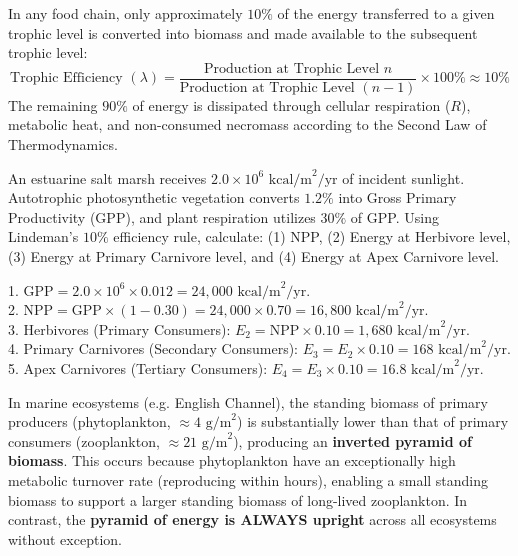 \begin{theorem}
In any food chain, only approximately $10\%$ of the energy transferred to a given trophic level is converted into biomass and made available to the subsequent trophic level:
\begin{equation}
\text{Trophic Efficiency } (\lambda) = \frac{\text{Production at Trophic Level } n}{\text{Production at Trophic Level } (n-1)} \times 100\% \approx 10\%
\end{equation}
The remaining $90\%$ of energy is dissipated through cellular respiration ($R$), metabolic heat, and non-consumed necromass according to the Second Law of Thermodynamics.
\end{theorem}

\begin{example}
An estuarine salt marsh receives $2.0 \times 10^6\text{ kcal/m}^2/\text{yr}$ of incident sunlight. Autotrophic photosynthetic vegetation converts $1.2\%$ into Gross Primary Productivity (GPP), and plant respiration utilizes $30\%$ of GPP. Using Lindeman's $10\%$ efficiency rule, calculate: (1) NPP, (2) Energy at Herbivore level, (3) Energy at Primary Carnivore level, and (4) Energy at Apex Carnivore level.
\end{example}

\begin{solutionbox}
1. $\text{GPP} = 2.0 \times 10^6 \times 0.012 = 24{,}000\text{ kcal/m}^2/\text{yr}$. \\
2. $\text{NPP} = \text{GPP} \times (1 - 0.30) = 24{,}000 \times 0.70 = 16{,}800\text{ kcal/m}^2/\text{yr}$. \\
3. Herbivores (Primary Consumers): $E_2 = \text{NPP} \times 0.10 = 1{,}680\text{ kcal/m}^2/\text{yr}$. \\
4. Primary Carnivores (Secondary Consumers): $E_3 = E_2 \times 0.10 = 168\text{ kcal/m}^2/\text{yr}$. \\
5. Apex Carnivores (Tertiary Consumers): $E_4 = E_3 \times 0.10 = 16.8\text{ kcal/m}^2/\text{yr}$.
\end{solutionbox}

\begin{casestudy}
In marine ecosystems (e.g. English Channel), the standing biomass of primary producers (phytoplankton, $\approx 4\text{ g/m}^2$) is substantially lower than that of primary consumers (zooplankton, $\approx 21\text{ g/m}^2$), producing an \textbf{inverted pyramid of biomass}. This occurs because phytoplankton have an exceptionally high metabolic turnover rate (reproducing within hours), enabling a small standing biomass to support a larger standing biomass of long-lived zooplankton. In contrast, the \textbf{pyramid of energy is ALWAYS upright} across all ecosystems without exception.
\end{casestudy}

